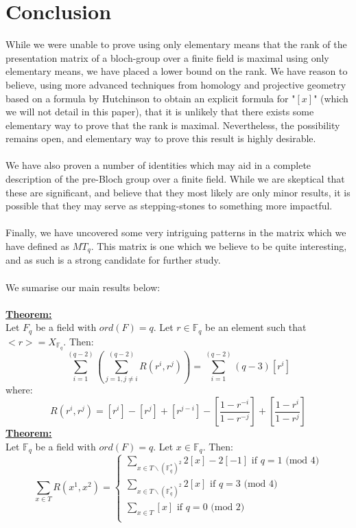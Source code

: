 \documentclass[11pt]{article}
\theoremstyle{plain}
\theoremstyle{definition}
\begin{document}
\section{Conclusion}\label{section:Conclusion}
While we were unable to prove using only elementary means that the rank of the presentation matrix of a bloch-group over a finite field is maximal using only elementary means, we have placed a lower bound on the rank. We have reason to believe, using more advanced techniques from homology and projective geometry based on a formula by Hutchinson \cite{1107.0264} to obtain an explicit formula for "$[x]$" (which we will not detail in this paper), that it is unlikely that there exists some elementary way to prove that the rank is maximal. Nevertheless, the possibility remains open, and elementary way to prove this result is highly desirable.\\
\\
We have also proven a number of identities which may aid in a complete description of the pre-Bloch group over a finite field. While we are skeptical that these are significant, and believe that they most likely are only minor results, it is possible that they may serve as stepping-stones to something more impactful.\\
\\
Finally, we have uncovered some very intriguing patterns in the matrix which we have defined as $MT_q$. This matrix is one which we believe to be quite interesting, and as such is a strong candidate for further study.\\
\\
We sumarise our main results below:\\
\\
\textbf{\underline{Theorem:}}\\
Let $F_q$ be a field with $ord(F) = q$. Let $r \in \mathbb{F}_q$ be an element such that  $<r> = X_{\mathbb{F}_q}$. Then:
\begin{equation*}
\sum\limits_{i=1}^{(q-2)}( \sum\limits_{j=1, j \neq i}^{(q-2)} R(r^i,r^j) ) = \sum\limits_{i=1}^{(q-2)} (q-3)[r^i]
\end{equation*}
where:
\begin{equation*}
R(r^{i},r^{j}) = [r^{i}] - [r^{j}] + [r^{j-i}] - [\frac{1-r^{-i}}{1-r^{-j}}] + [\frac{1-r^{i}}{1-r^{j}}]
\end{equation*}
\textbf{\underline{Theorem:}}\\
Let $\mathbb{F}_q$ be a field with $ord(F) = q$. Let $x \in \mathbb{F}_q$. Then:
\begin{equation*}
\sum\limits_{x \in T} R(x^1,x^2)  =  
\begin{cases} 
\sum\limits_{x \in T \backslash (\mathbb{F}_q ^* )^2} 2[x] - 2[-1] \text{ if } q = 1 \text{ (mod } 4)\\
\sum\limits_{x \in T \backslash (\mathbb{F}_q ^* )^2} 2[x]  \text{ if } q = 3 \text{ (mod } 4)\\
\sum\limits_{x \in T} [x] \text{ if } q = 0 \text{ (mod } 2)\\
\end{cases}
\end{equation*}
\end{document}
